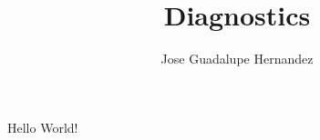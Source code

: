 \documentclass[12pt]{report}
\title{Diagnostics}
\author{Jose Guadalupe Hernandez}
\begin{document}
Hello World!
\end{document}
